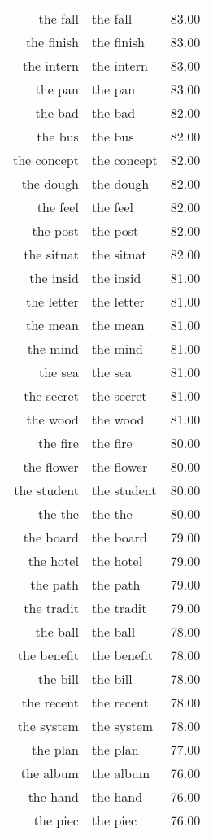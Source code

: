 \begin{table}[ht]
\begin{tabular}{rlr}
  the fall & the fall & 83.00 \\ 
  the finish & the finish & 83.00 \\ 
  the intern & the intern & 83.00 \\ 
  the pan & the pan & 83.00 \\ 
  the bad & the bad & 82.00 \\ 
  the bus & the bus & 82.00 \\ 
  the concept & the concept & 82.00 \\ 
  the dough & the dough & 82.00 \\ 
  the feel & the feel & 82.00 \\ 
  the post & the post & 82.00 \\ 
  the situat & the situat & 82.00 \\ 
  the insid & the insid & 81.00 \\ 
  the letter & the letter & 81.00 \\ 
  the mean & the mean & 81.00 \\ 
  the mind & the mind & 81.00 \\ 
  the sea & the sea & 81.00 \\ 
  the secret & the secret & 81.00 \\ 
  the wood & the wood & 81.00 \\ 
  the fire & the fire & 80.00 \\ 
  the flower & the flower & 80.00 \\ 
  the student & the student & 80.00 \\ 
  the the & the the & 80.00 \\ 
  the board & the board & 79.00 \\ 
  the hotel & the hotel & 79.00 \\ 
  the path & the path & 79.00 \\ 
  the tradit & the tradit & 79.00 \\ 
  the ball & the ball & 78.00 \\ 
  the benefit & the benefit & 78.00 \\ 
  the bill & the bill & 78.00 \\ 
  the recent & the recent & 78.00 \\ 
  the system & the system & 78.00 \\ 
  the plan & the plan & 77.00 \\ 
  the album & the album & 76.00 \\ 
  the hand & the hand & 76.00 \\ 
  the piec & the piec & 76.00 \\ 

\end{tabular}
\end{table}
